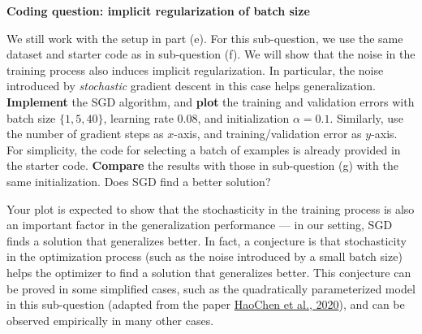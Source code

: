 \item{}\textbf{} \textbf{Coding question: implicit regularization of batch size}

We still work with the setup in part (e). For this sub-question, we use the same dataset and starter code as in sub-question (f). We will show that the noise in the training process also induces implicit regularization. In particular, the noise introduced by \emph{stochastic} gradient descent in this case helps generalization. \textbf{Implement} the SGD algorithm, and \textbf{plot} the training and validation errors with batch size $\{1, 5, 40\}$, learning rate $0.08$, and initialization $\alpha=0.1$. Similarly, use the number of gradient steps as $x$-axis, and training/validation error as $y$-axis. For simplicity, the code for selecting a batch of examples is already provided in the starter code.
\textbf{Compare} the results with those in sub-question (g) with the same initialization. Does SGD find a better solution?

Your plot is expected to show that the stochasticity in the training process is also an important factor in the generalization performance --- in our setting, SGD finds a solution that generalizes better. In fact, a conjecture is that stochasticity in the optimization process (such as the noise introduced by a small batch size) helps the optimizer to find a solution that generalizes better. This conjecture can be proved in some simplified cases, such as the quadratically parameterized model in this sub-question (adapted from the paper \href{https://arxiv.org/abs/2006.08680}{HaoChen et al., 2020}), and can be observed empirically in many other cases.